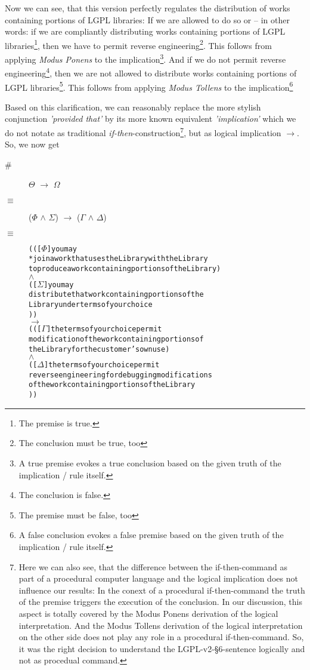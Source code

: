 Now we can see, that this version perfectly regulates the distribution of works
containing portions of LGPL libraries: If we are allowed to do so or -- in other
words: if we are compliantly distributing works containing portions of LGPL
libraries\footnote{The premise is true.}, then we have to permit reverse
engineering\footnote{The conclusion must be true, too}. This follows from
applying \emph{Modus Ponens} to the implication\footnote{A true premise evokes a
true conclusion based on the given truth of the implication / rule itself.}. And
if we do not permit reverse engineering\footnote{The conclusion is false.}, then
we are not allowed to distribute works containing portions of LGPL
libraries\footnote{The premise must be false, too}. This follows from applying
\emph{Modus Tollens} to the implication\footnote{A false conclusion evokes a
false premise based on the given truth of the implication / rule itself.}

Based on this clarification, we can reasonably replace the more stylish
conjunction \emph{'provided that'} by its more known equivalent
\emph{'implication'} which we do not notate as traditional
\emph{if-then}-construction\footnote{Here we can also see, that the difference
between the if-then-command as part of a procedural computer language and the
logical implication does not influence our results: In the conext of a
procedural if-then-command the truth of the premise triggers the execution of
the conclusion. In our discussion, this aspect is totally covered by the Modus
Ponens derivation of the logical interpretation. And the Modus Tollens
derivation of the logical interpretation on the other side does not play any
role in a procedural if-then-command. So, it was the right decision to
understand the LGPL-v2-§6-sentence logically and not as procedual command.}, but
as logical implication \emph{$\rightarrow$}. So, we now get

\begin{description}
  \item[\#] $\Theta$ $\rightarrow$ $\Omega$
  \item[$\equiv$] ($\Phi$ $\wedge$ $\Sigma$) $\rightarrow$ ($\Gamma$ $\wedge$
  $\Delta$)
  \item[$\equiv$]
\begin{alltt}   
  ( ( [\(\Phi\)] you may 
       *join a work that uses the Library with the Library
       to produce a work containing portions of the Library )
  \(\wedge\)
  ( [\(\Sigma\)] you may 
        distribute that work containing portions of the 
        Library under terms of your choice 
) )
\(\rightarrow\)
( ( [\(\Gamma\)] the terms of your choice permit 
        modification of the work containing portions of 
        the Library for the customer's own use )
  \(\wedge\)
  ( [\(\Delta\)] the terms of your choice permit
        reverse engineering for debugging modifications 
        of the work containing portions of the Library   
) )
\end{alltt}
\end{description}

